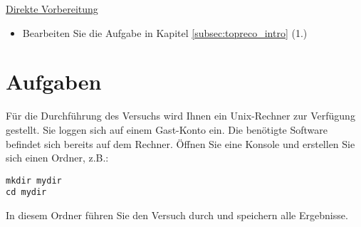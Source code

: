 \underline{Direkte Vorbereitung}
\begin{itemize}
\item Bearbeiten Sie die Aufgabe in Kapitel \ref{subsec:topreco_intro} (1.)
\end{itemize}


\section{Aufgaben}
F\"ur die Durchf\"uhrung des Versuchs wird Ihnen ein Unix-Rechner zur Verf\"ugung gestellt. Sie loggen sich auf einem Gast-Konto ein. Die ben\"otigte Software befindet sich bereits auf dem Rechner. \"Offnen Sie eine Konsole und erstellen Sie sich einen Ordner, z.B.:
\begin{lstlisting}
mkdir mydir
cd mydir
\end{lstlisting}
In diesem Ordner f\"uhren Sie den Versuch durch und speichern alle Ergebnisse.

